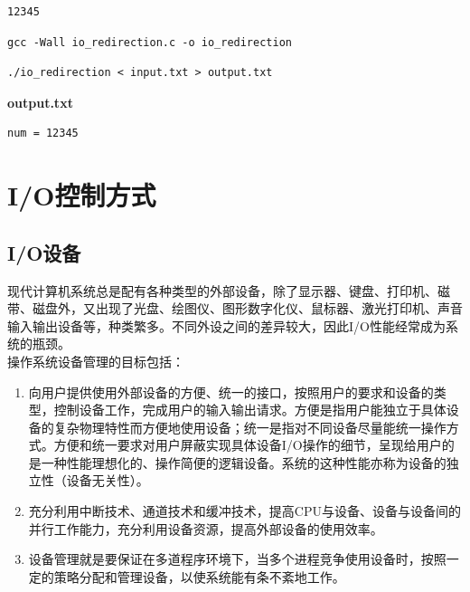 \begin{lstlisting}[title=input.txt]
12345
\end{lstlisting}

\begin{lstlisting}[title=编译]
gcc -Wall io_redirection.c -o io_redirection
\end{lstlisting}

\begin{lstlisting}[title=运行]
./io_redirection < input.txt > output.txt
\end{lstlisting}

\begin{tcolorbox}
	\textbf{output.txt}
	\begin{verbatim}
num = 12345
	\end{verbatim}
\end{tcolorbox}

\newpage

\section{I/O控制方式}

\subsection{I/O设备}

现代计算机系统总是配有各种类型的外部设备，除了显示器、键盘、打印机、磁带、磁盘外，又出现了光盘、绘图仪、图形数字化仪、鼠标器、激光打印机、声音输入输出设备等，种类繁多。不同外设之间的差异较大，因此I/O性能经常成为系统的瓶颈。\\

操作系统设备管理的目标包括：

\begin{enumerate}
	\item 向用户提供使用外部设备的方便、统一的接口，按照用户的要求和设备的类型，控制设备工作，完成用户的输入输出请求。方便是指用户能独立于具体设备的复杂物理特性而方便地使用设备；统一是指对不同设备尽量能统一操作方式。方便和统一要求对用户屏蔽实现具体设备I/O操作的细节，呈现给用户的是一种性能理想化的、操作简便的逻辑设备。系统的这种性能亦称为设备的独立性（设备无关性）。

	\item 充分利用中断技术、通道技术和缓冲技术，提高CPU与设备、设备与设备间的并行工作能力，充分利用设备资源，提高外部设备的使用效率。

	\item 设备管理就是要保证在多道程序环境下，当多个进程竞争使用设备时，按照一定的策略分配和管理设备，以使系统能有条不紊地工作。
\end{enumerate}

